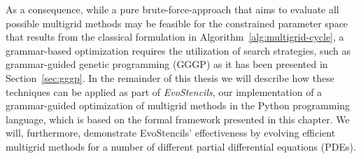 As a consequence, while a pure brute-force-approach that aims to evaluate all possible multigrid methods may be feasible for the constrained parameter space that results from the classical formulation in Algorithm~\ref{alg:multigrid-cycle}, a grammar-based optimization requires the utilization of search strategies, such as grammar-guided genetic programming (GGGP) as it has been presented in Section~\ref{sec:gggp}.
In the remainder of this thesis we will describe how these techniques can be applied as part of \emph{EvoStencils}, our implementation of a grammar-guided optimization of multigrid methods in the Python programming language, which is based on the formal framework presented in this chapter.
We will, furthermore, demonstrate EvoStencils' effectiveness by evolving efficient multigrid methods for a number of different partial differential equations (PDEs).

%	

